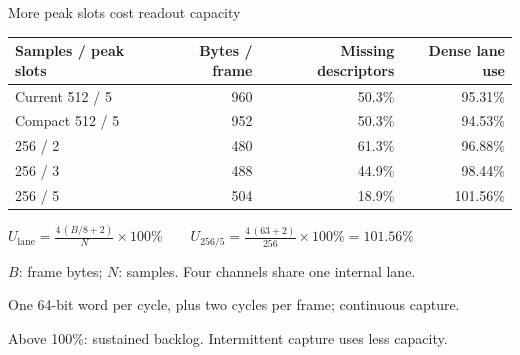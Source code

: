 \begin{frame}{More peak slots cost readout capacity}
  \centering
  {\small
  \renewcommand{\arraystretch}{1.18}
  \begin{tabular}{@{}lrrr@{}}
    \toprule
    Samples / peak slots & Bytes / frame & Missing descriptors & Dense lane use \\
    \midrule
    Current 512 / 5 & 960 & 50.3\% & 95.31\% \\
    Compact 512 / 5 & 952 & 50.3\% & 94.53\% \\
    256 / 2 & 480 & 61.3\% & 96.88\% \\
    256 / 3 & 488 & 44.9\% & 98.44\% \\
    256 / 5 & 504 & 18.9\% & \textcolor{DuneEditorialAccent}{101.56\%} \\
    \bottomrule
  \end{tabular}\par}
  \vspace{0.04cm}
  {\small
  \(\displaystyle
    U_{\mathrm{lane}}=\frac{4\,(B/8+2)}{N}\times100\%
    \qquad
    U_{256/5}=\frac{4\,(63+2)}{256}\times100\%=101.56\%
  \)\par\smallskip
  \(B\): frame bytes; \(N\): samples. Four channels share one internal lane.\par
  One 64-bit word per cycle, plus two cycles per frame; continuous capture.\par
  Above 100\%: sustained backlog. Intermittent capture uses less capacity.\par}
  \vspace{0.04cm}
\end{frame}
